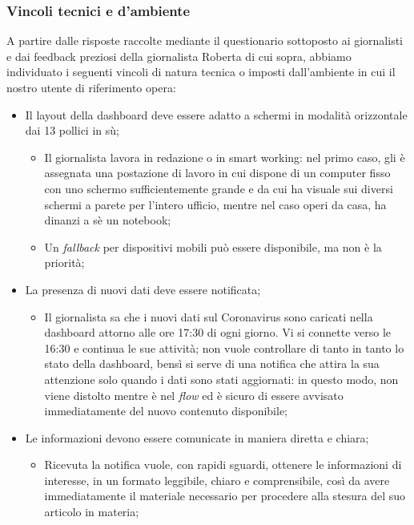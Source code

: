 \subsubsection{Vincoli tecnici e d'ambiente}
A partire dalle risposte raccolte mediante il questionario sottoposto ai giornalisti e dai feedback preziosi della giornalista Roberta di cui sopra, abbiamo individuato i seguenti vincoli di natura tecnica o imposti dall'ambiente in cui il nostro utente di riferimento opera:
\begin{itemize}
    \item Il layout della dashboard deve essere adatto a schermi in modalità orizzontale dai 13 pollici in sù;
    \begin{itemize}
        \item Il giornalista lavora in redazione o in smart working: nel primo caso, gli è assegnata una postazione di lavoro in cui dispone di un computer fisso con uno schermo sufficientemente grande e da cui ha visuale sui diversi schermi a parete per l'intero ufficio, mentre nel caso operi da casa, ha dinanzi a sè un notebook; 
        \item Un \textit{fallback} per dispositivi mobili può essere disponibile, ma non è la priorità;
    \end{itemize}
    \item La presenza di nuovi dati deve essere notificata;
    \begin{itemize}
        \item Il giornalista sa che i nuovi dati sul Coronavirus sono caricati nella dashboard attorno alle ore 17:30 di ogni giorno. Vi si connette verso le 16:30 e continua le sue attività; non vuole controllare di tanto in tanto lo stato della dashboard, bensì si serve di una notifica che attira la sua attenzione solo quando i dati sono stati aggiornati: in questo modo, non viene distolto mentre è nel \textit{flow} ed è sicuro di essere avvisato immediatamente del nuovo contenuto disponibile;
    \end{itemize}
	\item Le informazioni devono essere comunicate in maniera diretta e chiara;
	\begin{itemize}
        \item Ricevuta la notifica vuole, con rapidi sguardi, ottenere le informazioni di interesse, in un formato leggibile, chiaro e comprensibile, così da avere immediatamente il materiale necessario per procedere alla stesura del suo articolo in materia;
    \end{itemize}

\end{itemize}
